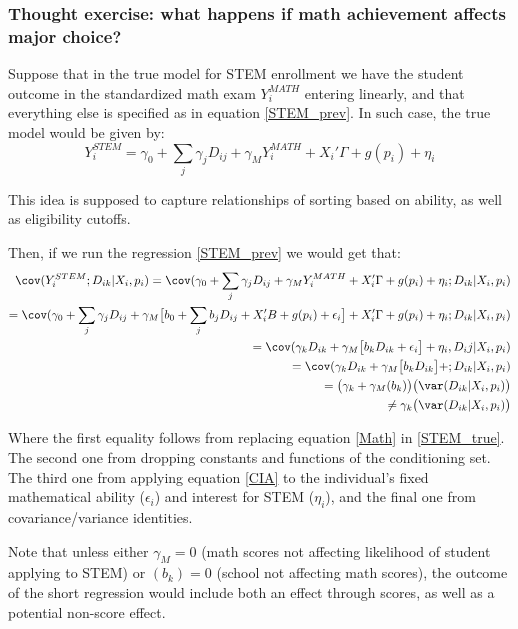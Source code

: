 \documentclass[a4paper, article, english, oneside, unknownkeysallowed, 12pt]{memoir}
\begin{document}
\subsubsection{Thought exercise: what happens if math achievement affects major choice?}

Suppose that in the true model for STEM enrollment we have the student outcome in the standardized math exam $Y^{MATH}_i$ entering linearly, and that everything else is specified as in equation \ref{STEM_prev}.
In such case, the true model would be given by: 
\begin{equation}
  Y^{STEM}_i = \gamma_0 + \sum_j \gamma_j D_{ij} +\gamma_M Y^{MATH}_i + X_i' \Gamma + g(p_i) + \eta_i 
  \label{STEM_true}
\end{equation}

This idea is supposed to capture relationships of sorting based on ability, as well as eligibility cutoffs. 


Then, if we run the regression \ref{STEM_prev} we would get that: 
\begin{align*}
\cov(Y^{STEM}_i; D_{ik} | X_i, p_i) = \cov(\gamma_0 + \sum_j \gamma_j D_{ij} +\gamma_M Y^{MATH}_i + X_i' \Gamma + g(p_i) + \eta_i; D_{ik} | X_i, p_i )   \\
= \cov(\gamma_0 + \sum_j \gamma_j D_{ij} +\gamma_M \big[  b_0 + \sum_j b_j D_{ij}  + X_i' B +   g(p_i) + \epsilon_i \big] + X_i' \Gamma + g(p_i) + \eta_i; D_{ik} | X_i, p_i ) \\
= \cov(\gamma_k D_{ik} +\gamma_M \big[  b_k D_{ik}  + \epsilon_i   \big] + \eta_i , D_ij | X_i, p_i) \\
= \cov(\gamma_k D_{ik} +\gamma_M \big[  b_k D_{ik}    \big] + ; D_{ik} | X_i, p_i) \\
= \big( \gamma_k + \gamma_M (b_k) \big) \big( \var(D_{ik} | X_i, p_i) \big) \\
\neq \gamma_k \big( \var(D_{ik} | X_i, p_i) \big) 
\end{align*}

Where the first equality follows from replacing equation \ref{Math} in \ref{STEM_true}. The second one from dropping constants and functions of the conditioning set. 
The third one from applying equation \ref{CIA} to the individual's fixed mathematical ability ($\epsilon_i$) and interest for STEM ($\eta_i$), and the final one from covariance/variance identities. 

Note that unless either $\gamma_M = 0$ (math scores not affecting likelihood of student applying to STEM) or $(b_k) = 0$ (school not affecting math scores), the outcome of the short regression would include both an effect through scores, as well as a potential non-score effect.
\end{document}
